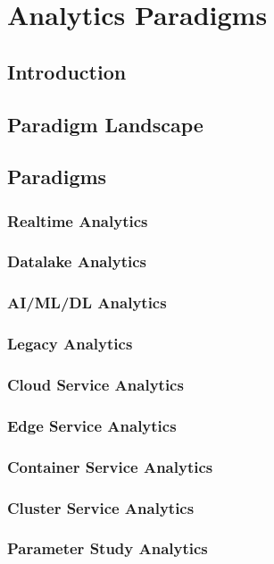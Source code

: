 \documentclass[12pt]{article}
\begin{document}
\section{Analytics Paradigms}

\subsection{Introduction}

\subsection{Paradigm Landscape}

\subsection{Paradigms}
\subsubsection{Realtime Analytics} 
\subsubsection{Datalake Analytics} 
\subsubsection{AI/ML/DL  Analytics} 
\subsubsection{Legacy Analytics}
\subsubsection{Cloud Service Analytics}

\subsubsection{Edge Service Analytics}
\subsubsection{Container Service Analytics}
\subsubsection{Cluster Service Analytics}
\subsubsection{Parameter Study Analytics}
\end{document}
